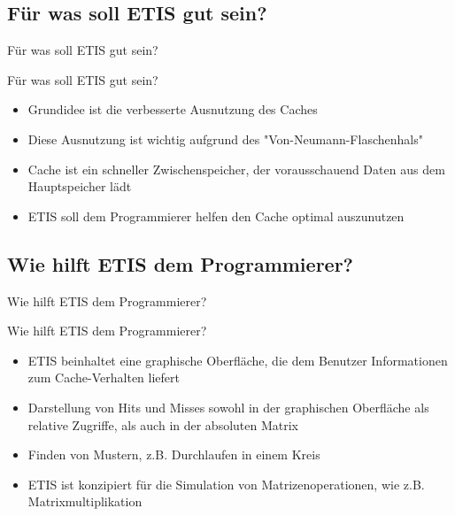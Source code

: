 \subsection{Für was soll ETIS gut sein?}
\begin{frame}{Für was soll ETIS gut sein?}
\begin{block}{Für was soll ETIS gut sein?}
\begin{itemize}[<+->]
\pause\item Grundidee ist die verbesserte Ausnutzung des Caches
\item Diese Ausnutzung ist wichtig aufgrund des "Von-Neumann-Flaschenhals"
\item Cache ist ein schneller Zwischenspeicher, der vorausschauend Daten aus dem Hauptspeicher lädt
\item ETIS soll dem Programmierer helfen den Cache optimal auszunutzen
\end{itemize}
\end{block}
\end{frame}

\subsection{Wie hilft ETIS dem Programmierer?}
\begin{frame}{Wie hilft ETIS dem Programmierer?}
\begin{block}{Wie hilft ETIS dem Programmierer?}
\begin{itemize}[<+->]
\pause\item ETIS beinhaltet eine graphische Oberfläche, die dem Benutzer Informationen zum Cache-Verhalten liefert
\item Darstellung von Hits und Misses sowohl in der graphischen Oberfläche als relative Zugriffe, als auch in der absoluten Matrix
\item Finden von Mustern, z.B. Durchlaufen in einem Kreis
\item ETIS ist konzipiert für die Simulation von Matrizenoperationen, wie z.B. Matrixmultiplikation
\end{itemize}
\end{block}
\end{frame}

